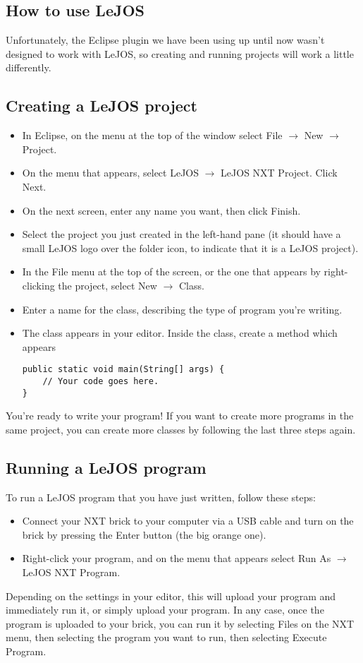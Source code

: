 \documentclass[11pt]{article}
\theoremstyle{plain}
\theoremstyle{definition}
\theoremstyle{remark}
\begin{document}
\begin{center}
\section*{How to use LeJOS}
\end{center}
Unfortunately, the Eclipse plugin we have been using up until now wasn't
designed to work with LeJOS, so creating and running projects will work a little
differently.\\
\subsection*{Creating a LeJOS project}
\begin{itemize}
  \item In Eclipse, on the menu at the top of the window select File $\to$ New
    $\to$ Project.
  \item On the menu that appears, select LeJOS $\to$ LeJOS NXT Project. Click
    Next.
  \item On the next screen, enter any name you want, then click Finish.
  \item Select the project you just created in the left-hand pane (it should
    have a small LeJOS logo over the folder icon, to indicate that it is a LeJOS
    project).
  \item In the File menu at the top of the screen, or the one that appears by
    right-clicking the project, select New $\to$ Class.
  \item Enter a name for the class, describing the type of program you're
    writing.
  \item The class appears in your editor. Inside the class, create a method
    which appears
    \begin{lstlisting}
public static void main(String[] args) {
    // Your code goes here.
}\end{lstlisting}
\end{itemize}
You're ready to write your program! If you want to create more programs in the
same project, you can create more classes by following the last three steps
again.
\subsection*{Running a LeJOS program}
To run a LeJOS program that you have just written, follow these steps:
\begin{itemize}
  \item Connect your NXT brick to your computer via a USB cable and turn on the
    brick by pressing the Enter button (the big orange one).
  \item Right-click your program, and on the menu that appears select Run As
    $\to$ LeJOS NXT Program.
\end{itemize}
Depending on the settings in your editor, this will upload your program and
immediately run it, or simply upload your program. In any case, once the program
is uploaded to your brick, you can run it by selecting Files on the NXT menu,
then selecting the program you want to run, then selecting Execute Program.
\end{document}
